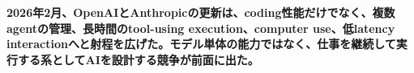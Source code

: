 \noindent\textbf{2026年2月、OpenAIとAnthropicの更新は、coding性能だけでなく、複数agentの管理、長時間のtool-using execution、computer use、低latency interactionへと射程を広げた。モデル単体の能力ではなく、仕事を継続して実行する系としてAIを設計する競争が前面に出た。}\autocite{src-15823ae5556e,src-9aba7995b6a5,src-f6aa679babd7}

